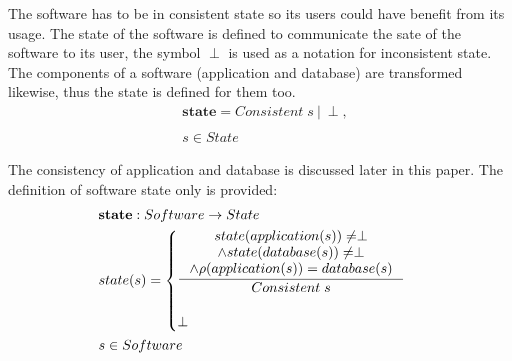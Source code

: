 \documentclass[11pt]{article}
\begin{document}
The software has to be in consistent state so its users could have benefit from its usage. The state of the software is defined to communicate the sate of the software to its user, the symbol $\perp$ is used as a notation for inconsistent state. The components of a software (application and database) are transformed likewise, thus the state is defined for them too.
\begin{align*}
& 	\mathbf{state} = Consistent\; s \: | \: \perp,  \\\\
& 	s \in State 
\end{align*}


The consistency of application and database is discussed later in this paper. The definition of software state only is provided:
\begin{align*}
&	\mathbf{state} : Software \rightarrow State \\
&	state(s) = \begin{cases}
 		\inference{state(application(s)) \neq \perp \\
 		\wedge state(database(s)) \neq \perp \\
 		\wedge \rho(application(s)) = database(s)}{Consistent \; s}\\ \\
 		\perp
 	\end{cases} \\ 
& 	s \in Software
\end{align*}
\end{document}
